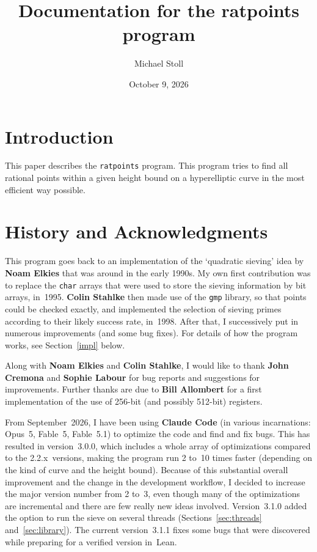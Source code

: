 \documentclass[12pt,a4paper,oneside]{amsart}
\begin{document}
\title{Documentation for the ratpoints program}

\author{Michael Stoll}
\address{Mathematisches Institut,
         Universit\"at Bayreuth,
         95440 Bayreuth, Germany.}
\date{October 9, 2026}

\maketitle


\section{Introduction}

This paper describes the \texttt{ratpoints} program. This program tries to
find all rational points within a given height bound on a hyperelliptic
curve in the most efficient way possible.


\section{History and Acknowledgments}

This program goes back to an implementation of the `quadratic sieving'
idea by \textbf{Noam Elkies} that was around in the early 1990s. My own
first contribution was to replace the \texttt{char} arrays that were used
to store the sieving information by bit arrays, in~1995. \textbf{Colin Stahlke}
then made use of the \texttt{gmp} library, so that points could be checked
exactly, and implemented the selection of sieving primes according to
their likely success rate, in~1998. After that, I successively put in
numerous improvements (and some bug fixes). For details of how the
program works, see Section~\ref{impl} below.

Along with \textbf{Noam Elkies} and \textbf{Colin Stahlke}, I would like to
thank \textbf{John Cremona} and \textbf{Sophie Labour} for bug reports and
suggestions for improvements. Further thanks are due to \textbf{Bill Allombert}
for a first implementation of the use of 256-bit (and possibly 512-bit) registers.

From September~2026, I have been using \textbf{Claude Code} (in various
incarnations: Opus~5, Fable~5, Fable~5.1) to optimize the code and find and fix
bugs. This has resulted in version~3.0.0, which includes
a whole array of optimizations compared to the 2.2.x~versions, making
the program run 2 to~10 times faster (depending on the kind
of curve and the height bound). Because of this substantial overall
improvement and the change in the development workflow, I decided to
increase the major version number from 2 to~3, even though many of
the optimizations are incremental and there are few really new ideas involved.
Version~3.1.0 added the option to run the sieve on several
threads (Sections~\ref{sec:threads} and~\ref{sec:library}).
The current version~3.1.1 fixes some bugs that were discovered while preparing
for a verified version in~Lean.
\end{document}
